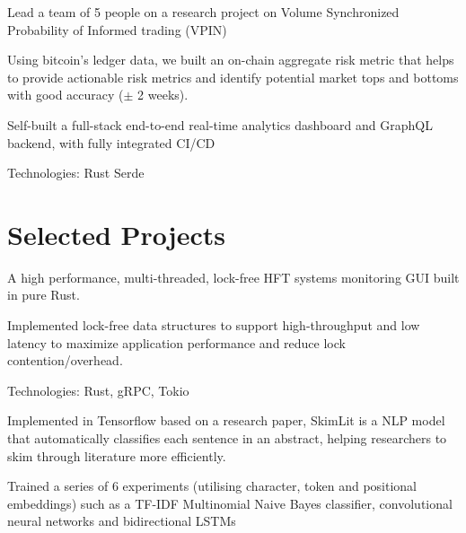 \documentclass[]{deedy-resume-openfont}
\begin{document}
\begin{minipage}[t]{0.66\textwidth}
\subtitle{Aug 2022 – Present}
\begin{tightemize}
\item Lead a team of 5 people on a research project on Volume Synchronized Probability of Informed trading (VPIN)
\item Using bitcoin’s ledger data, we built an on-chain aggregate risk metric that helps to provide actionable risk metrics and identify potential market tops and bottoms with good accuracy ($\pm$ 2 weeks).
\item Self-built a full-stack end-to-end real-time analytics dashboard and GraphQL backend, with fully integrated CI/CD
\item Technologies: Rust \textbullet{} Serde \textbullet{} 
\end{tightemize}
\sectionsep

\section{Selected Projects}

\subtitle{\href{https://github.com/g-tejas/enigma/}{Github}}
\begin{tightemize}
    \item A high performance, multi-threaded, lock-free HFT systems monitoring GUI built in pure Rust.
    \item Implemented lock-free data structures to support high-throughput and low latency to maximize application performance and reduce lock contention/overhead.
    \item Technologies: Rust, gRPC, Tokio
\end{tightemize}
\sectionsep



\subtitle{\href{https://github.com/g-tejas/SkimLit/}{Github}}
\begin{tightemize}
    \item Implemented in Tensorflow based on a research paper, SkimLit is a NLP model that automatically classifies each sentence in an abstract, helping researchers to skim through literature more efficiently.
    \item Trained a series of 6 experiments (utilising character, token and positional embeddings) such as a TF-IDF Multinomial Naive Bayes classifier, convolutional neural networks and bidirectional LSTMs
\end{tightemize}
\sectionsep

\end{minipage} 
\end{document}
